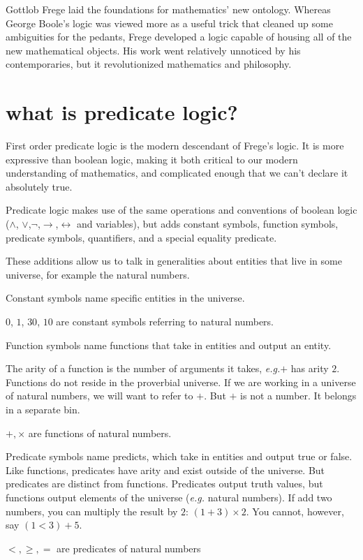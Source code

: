\documentclass{scrbook}
\renewcommand{\implies}{\to}
\renewcommand{\iff}{\leftrightarrow}
\newcommand{\eg}{\emph{e.g.}\xspace}
\begin{document}
Gottlob Frege laid the foundations for mathematics' new ontology. Whereas George Boole's logic was viewed more as a useful trick that cleaned up some ambiguities for the pedants, Frege developed a logic capable of housing all of the new mathematical objects. His work went relatively unnoticed by his contemporaries, but it revolutionized mathematics and philosophy. 

\section[What is Predicate Logic?]{what is predicate logic?}
First order predicate logic is the modern descendant of Frege's logic. It is more expressive than boolean logic, making it both critical to our modern understanding of mathematics, and complicated enough that we can't declare it absolutely true. 

Predicate logic makes use of the same operations and conventions of boolean logic ($\wedge$, $\vee$,$\neg$,$\implies$,$\iff$ and variables), but adds constant symbols, function symbols,  predicate symbols, quantifiers, and a special equality predicate. 

These additions allow us to talk in generalities about entities that live in some universe, for example the natural numbers. 

\begin{defn}
  Constant symbols name specific entities in the universe.
\begin{example}
  $0$, $1$, $30$, $10$ are constant symbols referring to natural numbers. 
\end{example}
\end{defn}

\begin{defn}
  Function symbols name functions that take in entities and output an
  entity.

  The arity of a function is the number of arguments it takes, \eg $+$ has arity $2$.
Functions do not reside in the proverbial universe. If we are working in a universe of natural numbers, we will want to refer to $+$. But $+$ is not a number. It belongs in a separate bin.
\end{defn}
\begin{example}
  $+,\times$ are functions of natural numbers. 
\end{example}
\begin{defn}
  Predicate symbols name predicts, which take in entities and output true or false.
Like functions, predicates have arity and exist outside of the universe. But predicates are distinct from functions. Predicates output truth values, but functions output elements of the universe (\eg natural numbers). If add two numbers, you can multiply the result by $2$: $(1+3)\times 2$. You cannot, however, say $(1<3)+5$. 
\end{defn}
\begin{example}
  $<,\geq,=$ are predicates of natural numbers
\end{example}
\end{document}
